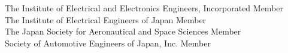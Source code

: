 
\begin{small} \color{black}
The Institute of Electrical and Electronics Engineers, Incorporated Member \\
The Institute of Electrical Engineers of Japan Member \\
The Japan Society for Aeronautical and Space Sciences Member \\
Society of Automotive Engineers of Japan, Inc. Member
\end{small}
